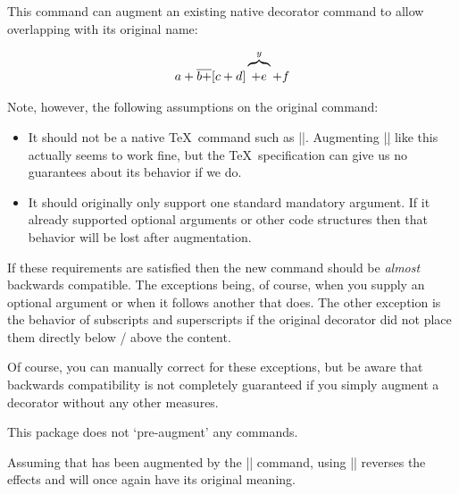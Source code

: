 \documentclass[a4paper]{packagedoc}
\begin{document}


\noindent This command can augment an existing native decorator command to
allow overlapping with its original name:

\begin{latex-example-show}
\UOLaugment\overline
\UOLaugment\overbrace
\[ a + \overline{b +}[c + d] \overbrace{\bigstrut + e}^y + f \]
\end{latex-example-show}

\noindent Note, however, the following assumptions on the original command:
\begin{itemize}
  \item It should not be a native \TeX\ command such as |\underline|.
        Augmenting |\underline| like this actually seems to work fine, but the
        \TeX\ specification can give us no guarantees about its behavior if
        we do. 
  \item It should originally only support one standard mandatory argument.
        If it already supported optional arguments or other code structures
        then that behavior will be lost after augmentation.
\end{itemize}

\noindent If these requirements are satisfied then the new command should be
\emph{almost} backwards compatible. The exceptions being, of course,
when you supply an optional argument or when it follows another
 that does. The other exception is the behavior of
subscripts and superscripts if the original decorator did not place them
directly below / above the content.

Of course, you can manually correct for these exceptions, but be aware
that backwards compatibility is not completely guaranteed if you simply
augment a decorator without any other measures.

This package does not `pre-augment' any commands.



\noindent Assuming that  has been augmented by the
|\UOLaugment| command, using |\UOLunaugment| reverses the effects and
 will once again have its original meaning.
\end{document}
